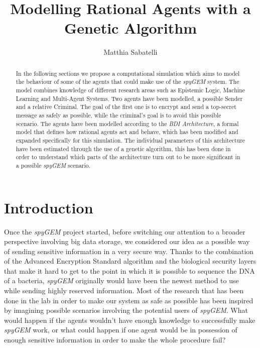 \documentclass[a4paper]{article}
\begin{document}
\title {Modelling Rational Agents with a Genetic Algorithm}
\author{Matthia Sabatelli}

\pagestyle{empty}
\maketitle


\thispagestyle{empty}
\begin{abstract}

In the following sections we propose a computational simulation which aims to model the behaviour of some of the agents that could make use of the \textit{spyGEM} system. The model combines knowledge of different research areas such as Epistemic Logic, Machine Learning and Multi-Agent Systems. Two agents have been modelled, a possible Sender and a relative Criminal. The goal of the first one is to encrypt and send a top-secret message as safely as possible, while the criminal's goal is to avoid this possible scenario. The agents have been modelled according to the \textit{BDI Architecture}, a formal model that defines how rational agents act and behave, which has been modified and expanded specifically for this simulation. The individual parameters of this architecture have been estimated through the use of a genetic algorithm, this has been done in order to understand which parts of the architecture turn out to be more significant in a possible \textit{spyGEM} scenario.        

\end{abstract}

\section{Introduction}

Once the \textit{spyGEM} project started, before switching our attention to a broader perspective involving big data storage, we considered our idea as a possible way of sending sensitive information in a very secure way. Thanks to the combination of the Advanced Encryption Standard algorithm and the biological security layers that make it hard to get to the point in which it is possible to sequence the DNA of a bacteria, \textit{spyGEM} originally would have been the newest method to use while sending highly reserved information. Most of the research that has been done in the lab in order to make our system as safe as possible has been inspired by imagining possible scenarios involving the potential users of \textit{spyGEM}. What would happen if the agents wouldn't have enough knowledge to successfully make \textit{spyGEM} work, or what could happen if one agent would be in possession of enough sensitive information in order to make the whole procedure fail?        
\end{document}
